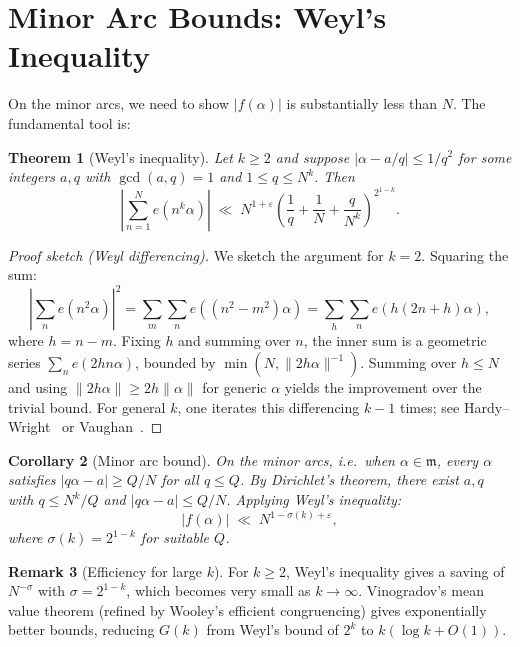 \documentclass[12pt,a4paper]{amsart}
\newtheorem{theorem}{Theorem}[section]
\newtheorem{corollary}[theorem]{Corollary}
\theoremstyle{definition}
\newtheorem{remark}[theorem]{Remark}
\newcommand{\eq}[1]{e\!\left(#1\right)}
\begin{document}
\section{Minor Arc Bounds: Weyl's Inequality}
\label{sec:minor}

On the minor arcs, we need to show $|f(\alpha)|$ is substantially less
than $N$.  The fundamental tool is:

\begin{theorem}[Weyl's inequality]\label{thm:weyl}
  Let $k \geq 2$ and suppose $|\alpha - a/q| \leq 1/q^2$ for some
  integers $a, q$ with $\gcd(a,q) = 1$ and $1 \leq q \leq N^k$.  Then
  \[
    \left|\sum_{n=1}^{N} \eq{n^k \alpha}\right|
    \;\ll\; N^{1+\varepsilon}
             \left(\frac{1}{q} + \frac{1}{N} + \frac{q}{N^k}\right)^{2^{1-k}}.
  \]
\end{theorem}

\begin{proof}[Proof sketch (Weyl differencing)]
  We sketch the argument for $k = 2$.  Squaring the sum:
  \[
    \left|\sum_n \eq{n^2 \alpha}\right|^2
    = \sum_m \sum_n \eq{(n^2 - m^2)\alpha}
    = \sum_h \sum_n \eq{h(2n + h)\alpha},
  \]
  where $h = n - m$.  Fixing $h$ and summing over $n$, the inner sum is
  a geometric series $\sum_n \eq{2hn\alpha}$, bounded by
  $\min(N, \|2h\alpha\|^{-1})$.  Summing over $h \leq N$ and using
  $\|2h\alpha\| \geq 2h\|\alpha\|$ for generic $\alpha$ yields the
  improvement over the trivial bound.  For general $k$, one iterates
  this differencing $k-1$ times; see Hardy--Wright~\cite[Chapter~21]{HardyWright}
  or Vaughan~\cite[Chapter~2]{Vaughan1981}.
\end{proof}

\begin{corollary}[Minor arc bound]\label{cor:minor}
  On the minor arcs, i.e.\ when $\alpha \in \mathfrak{m}$, every $\alpha$
  satisfies $|q\alpha - a| \geq Q/N$ for all $q \leq Q$.  By Dirichlet's
  theorem, there exist $a, q$ with $q \leq N^k/Q$ and
  $|q\alpha - a| \leq Q/N$.  Applying Weyl's inequality:
  \[
    |f(\alpha)| \;\ll\; N^{1 - \sigma(k) + \varepsilon},
  \]
  where $\sigma(k) = 2^{1-k}$ for suitable $Q$.
\end{corollary}

\begin{remark}[Efficiency for large $k$]
  For $k \geq 2$, Weyl's inequality gives a saving of $N^{-\sigma}$ with
  $\sigma = 2^{1-k}$, which becomes very small as $k \to \infty$.
  Vinogradov's mean value theorem (refined by Wooley's efficient
  congruencing) gives exponentially better bounds, reducing $G(k)$ from
  Weyl's bound of $2^k$ to $k(\log k + O(1))$.
\end{remark}
\end{document}
